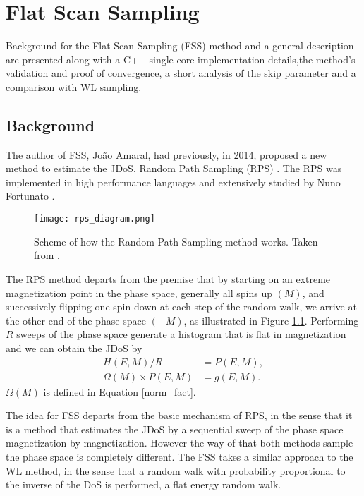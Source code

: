 \chapter{Flat Scan Sampling}

	Background for the Flat Scan Sampling (FSS) method and a general description are presented along with a C++ single core implementation details,the method's validation and proof of convergence, a short analysis of the skip parameter and a comparison with WL sampling.

\section{Background}

	The author of FSS, João Amaral, had previously, in 2014, proposed a new method to estimate the JDoS, Random Path Sampling (RPS) \cite{Amaral2014}.  The RPS was implemented in high performance languages and extensively studied by Nuno Fortunato \cite{Fortunato2015,Fortunato2016,Korotana2016}. 
	
\begin{figure}[h]
	\centering
	\texttt{[image: rps\_diagram.png]}
	\caption{Scheme of how the Random Path Sampling method works. Taken from \cite{Fortunato2015}.}
	\label{rps_dia}
\end{figure}
	
	The RPS method departs from the premise that by starting on an extreme magnetization point in the phase space, generally all spins up $(M)$, and successively flipping one spin down at each step of the random walk, we arrive at the other end of the phase space $(-M)$, as illustrated in Figure \ref{rps_dia}. Performing $R$ sweeps of the phase space generate a histogram that is flat in magnetization and we can obtain the JDoS by 
\begin{align}
	H(E, M)/R &= P(E, M), \\
	\Omega(M) \times P(E, M) &= g(E, M).
\end{align}
$\Omega(M)$ is defined in Equation \ref{norm_fact}.

	The idea for FSS departs from the basic mechanism of RPS, in the sense that it is a method that estimates the JDoS by a sequential sweep of the phase space magnetization by magnetization. However the way of that both methods sample the phase space is completely different. The FSS takes a similar approach to the WL method, in the sense that a random walk with probability proportional to the inverse of the DoS is performed, a flat energy random walk.
	
